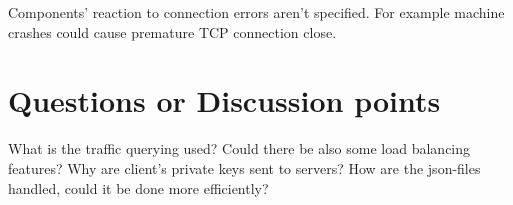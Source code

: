 \documentclass{article}
\begin{document}
Components' reaction to connection errors aren't specified. For example machine crashes could cause premature TCP connection close. 

\section{Questions or Discussion points}
What is the traffic querying used? Could there be also some load balancing features? Why are client's private keys sent to servers? How are the json-files handled, could it be done more efficiently?
\end{document}
